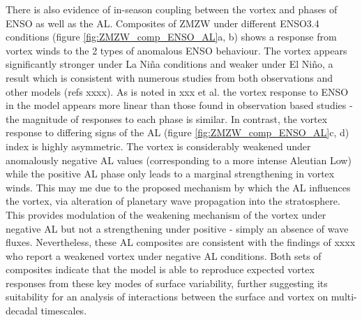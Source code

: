 There is also evidence of in-season coupling between the vortex and phases of ENSO as well as the AL. Composites of ZMZW under different ENSO3.4 conditions (figure \ref{fig:ZMZW_comp_ENSO_AL}a, b) shows a response from vortex winds to the 2 types of anomalous ENSO behaviour. The vortex appears significantly stronger under La Ni\~{n}a conditions and weaker under El Ni\~{n}o, a result which is consistent with numerous studies from both observations and other models (refs xxxx). As is noted in xxx et al. the vortex response to ENSO in the model appears more linear than those found in observation based studies - the magnitude of responses to each phase is similar. In contrast, the vortex response to differing signs of the AL (figure \ref{fig:ZMZW_comp_ENSO_AL}c, d) index is highly asymmetric. The vortex is considerably weakened under anomalously negative AL values (corresponding to a more intense Aleutian Low) while the positive AL phase only leads to a marginal strengthening in vortex winds. This may me due to the proposed mechanism by which the AL influences the vortex, via alteration of planetary wave propagation into the stratosphere. This provides modulation of the weakening mechanism of the vortex under negative AL but not a strengthening under positive - simply an absence of wave fluxes. Nevertheless, these AL composites are consistent with the findings of xxxx who report a weakened vortex under negative AL conditions. Both sets of composites indicate that the model is able to reproduce expected vortex responses from these key modes of surface variability, further suggesting its suitability for an analysis of interactions between the surface and vortex on multi-decadal timescales. 

